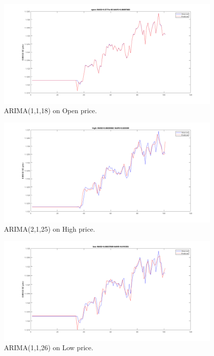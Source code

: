 \documentclass[11pt]{article}
\begin{document}
\begin{figure}[H]
  \centering
  \includegraphics[width=\textwidth,keepaspectratio]{figs/var20open100.png}
  \caption{ARIMA(1,1,18) on Open price.}
\end{figure}

\begin{figure}[H]
  \centering
  \includegraphics[width=\linewidth,keepaspectratio]{figs/var20high100.png}
  \caption{ARIMA(2,1,25) on High price.}
\end{figure}

\begin{figure}[H]
  \centering
  \includegraphics[width=\linewidth,keepaspectratio]{figs/var20low100.png}
  \caption{ARIMA(1,1,26) on Low price.}
\end{figure}
\end{document}

